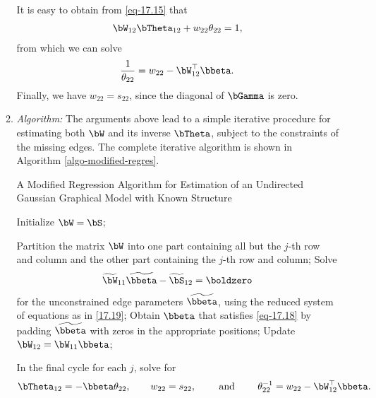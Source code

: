 \documentclass[12pt]{article}
\begin{document}
\begin{enumerate}[label=\textbf{\arabic*.}]
\begin{enumerate}
		It is easy to obtain from \eqref{eq-17.15} that 
		\begin{align*}
			\bW_{12} \bTheta_{12} + w_{22} \theta_{22} = 1, 
		\end{align*}
		from which we can solve 
		\begin{align*}
			\frac{1}{\theta_{22}} = w_{22} - \bW_{12}^\top \bbeta. 
		\end{align*}
		Finally, we have $w_{22} = s_{22}$, since the diagonal of $\bGamma$ is zero. 
		
		\item \textit{Algorithm:} The arguments above lead to a simple iterative procedure for estimating both $\bW$ and its inverse $\bTheta$, subject to the constraints of the missing edges. The complete iterative algorithm is shown in Algorithm \ref{algo-modified-regres}. 
		
		\begin{minipage}{\linewidth}
			\begin{algorithm}[H]
				\caption{A Modified Regression Algorithm for Estimation of an Undirected Gaussian Graphical Model with Known Structure}\label{algo-modified-regres}
				\begin{algorithmic}[1]
					\STATE Initialize $\bW = \bS$; 
					
					\REPEAT{}
					\STATE Partition the matrix $\bW$ into one part containing all but the $j$-th row and column and the other part containing the $j$-th row and column; 
					\STATE Solve 
					\begin{align*}
						\widetilde{\bW}_{11} \widetilde{\bbeta} - \widetilde{\bS}_{12} = \boldzero
					\end{align*}
					for the unconstrained edge parameters $\widetilde{\bbeta}$, using the reduced system of equations as in \eqref{17.19}; 
					\STATE Obtain $\bbeta$ that satisfies \eqref{eq-17.18} by padding $\widetilde{\bbeta}$ with zeros in the appropriate positions; 
					\STATE Update $\bW_{12} = \bW_{11} \bbeta$; 
					\ENDFOR
					
					\STATE In the final cycle for each $j$, solve for 
					\begin{align*}
						\bTheta_{12} = - \bbeta \theta_{22}, \qquad w_{22} = s_{22}, \qquad  \text{ and } \qquad \theta_{22}^{-1} = w_{22} - \bW_{12}^\top \bbeta. 
					\end{align*}
				
				\end{algorithmic}
			\end{algorithm}
		\end{minipage}
	\end{enumerate}

\end{enumerate}
\end{document}
